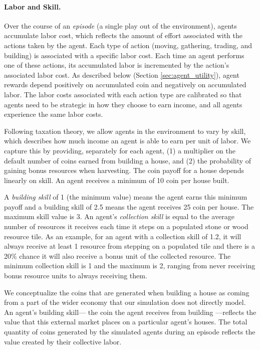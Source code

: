 \paragraph{Labor and Skill.}
Over the course of an {\em episode} (a single play out of the environment), agents  accumulate labor cost, which reflects the amount of effort associated with the actions taken by the agent.
Each type of action (moving, gathering, trading, and building) is associated with a specific labor cost.
Each time an agent performs one of these actions, its accumulated labor is incremented by the action's associated labor cost.
As described below (Section \ref{sec:agent_utility}), agent rewards depend positively on accumulated coin and negatively on accumulated labor.
The labor costs associated with each action type are calibrated so that agents need to be strategic in how they choose to earn income, and all agents experience the same labor costs.

Following taxation theory, we allow agents in the environment to vary by  skill, which describes how much income an agent is able to earn per unit of labor.
We capture this by providing, separately for each agent, (1) a multiplier on the default number of coins earned from building a house, and (2) the probability of gaining bonus resources when harvesting.
The coin payoff for a house depends linearly on skill.
An agent receives a minimum of 10 coin per house built.

A {\em building skill} of 1 (the minimum value) means the agent earns this minimum payoff and a building skill of 2.5 means the agent receives 25 coin per house. The maximum skill value is 3.
An agent's {\em collection skill} is equal to the average number of resources it receives each time it steps on a populated stone or wood resource tile.
As an example, for an agent with a collection skill of 1.2, it will always receive at least 1 resource from stepping on a populated tile and there is a 20\% chance it will also receive a bonus unit of the collected resource.
The minimum collection skill is 1 and the maximum is 2, ranging from never receiving bonus resource units to always receiving them.

We conceptualize the coins that are generated when building a house as coming from a part of the wider economy that our simulation does not directly model. An agent's building skill--- the coin the agent receives from building ---reflects the value that this external market places on a particular agent's houses. The total quantity of coins generated by the simulated agents during an episode reflects the value created by their collective labor.

